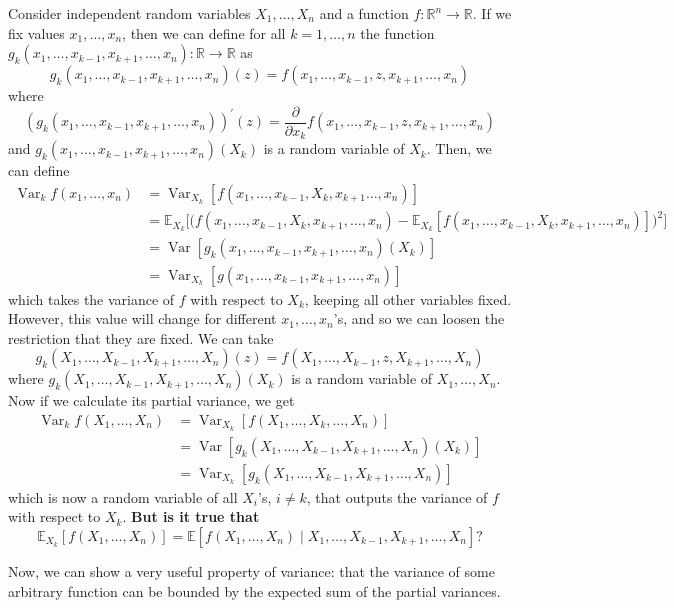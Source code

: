 \documentclass{article}
\DeclareMathOperator{\Var}{Var}
\theoremstyle{definition}
\theoremstyle{remark}
\theoremstyle{definition}
\begin{document}
  Consider independent random variables $X_1, \ldots, X_n$ and a function $f: \mathbb{R}^n \longrightarrow \mathbb{R}$. If we fix values $x_1, \ldots, x_n$, then we can define for all $k = 1, \ldots, n$ the function $g_{k}(x_1, \ldots, x_{k-1}, x_{k+1}, \ldots, x_n): \mathbb{R} \rightarrow \mathbb{R}$ as 
  \[g_{k}(x_1, \ldots, x_{k-1}, x_{k+1}, \ldots, x_n)(z) = f(x_1, \ldots, x_{k-1}, z, x_{k+1}, \ldots, x_n)\]
  where 
  \[(g_{k}(x_1, \ldots, x_{k-1}, x_{k+1}, \ldots, x_n))^\prime (z) = \frac{\partial}{\partial x_k} f(x_1, \ldots, x_{k-1}, z, x_{k+1}, \ldots, x_n)\]
  and $g_k (x_1, \ldots, x_{k-1}, x_{k+1}, \ldots, x_n) (X_k)$ is a random variable of $X_k$. Then, we can define 
  \begin{align*}
      \Var_k f(x_1, \ldots, x_n) & = \Var_{X_k} [ f(x_1, \ldots, x_{k-1}, X_k, x_{k+1} \ldots, x_n)] \\ 
      & = \mathbb{E}_{X_k} \big[ \big( f (x_1, \ldots, x_{k-1}, X_k, x_{k+1}, \ldots, x_n) - \mathbb{E}_{X_k} [f (x_1, \ldots, x_{k-1}, X_k, x_{k+1}, \ldots, x_n)] \big)^2 \big] \\
      & = \Var[g_{k} (x_1, \ldots, x_{k-1}, x_{k+1}, \ldots, x_n) (X_k)] \\
      & = \Var_{X_k} [g(x_1, \ldots, x_{k-1}, x_{k+1}, \ldots, x_n)] 
  \end{align*}
  which takes the variance of $f$ with respect to $X_k$, keeping all other variables fixed. However, this value will change for different $x_1, \ldots, x_n$'s, and so we can loosen the restriction that they are fixed. We can take 
  \[g_k (X_1, \ldots, X_{k-1}, X_{k+1}, \ldots, X_n) (z) = f(X_1, \ldots, X_{k-1}, z, X_{k+1}, \ldots, X_n)\]
  where $g_k (X_1, \ldots, X_{k-1}, X_{k+1}, \ldots, X_n) (X_k)$ is a random variable of $X_1, \ldots, X_n$. Now if we calculate its partial variance, we get 
  \begin{align*}
      \Var_k f(X_1, \ldots, X_n) & = \Var_{X_k} [f(X_1, \ldots, X_k, \ldots, X_n)]\\
      & = \Var [g_k (X_1, \ldots, X_{k-1}, X_{k+1}, \ldots, X_n) (X_k)] \\
      & = \Var_{X_k} [g_k (X_1, \ldots, X_{k-1}, X_{k+1}, \ldots, X_n)]
  \end{align*}
  which is now a random variable of all $X_i$'s, $i \neq k$, that outputs the variance of $f$ with respect to $X_k$. \textbf{But is it true that }
  \[\mathbb{E}_{X_k} [ f(X_1, \ldots, X_n)] = \mathbb{E}[ f(X_1, \ldots, X_n) \mid X_1, \ldots, X_{k-1}, X_{k+1}, \ldots, X_n] ?\]


  Now, we can show a very useful property of variance: that the variance of some arbitrary function can be bounded by the expected sum of the partial variances. 
\end{document}
